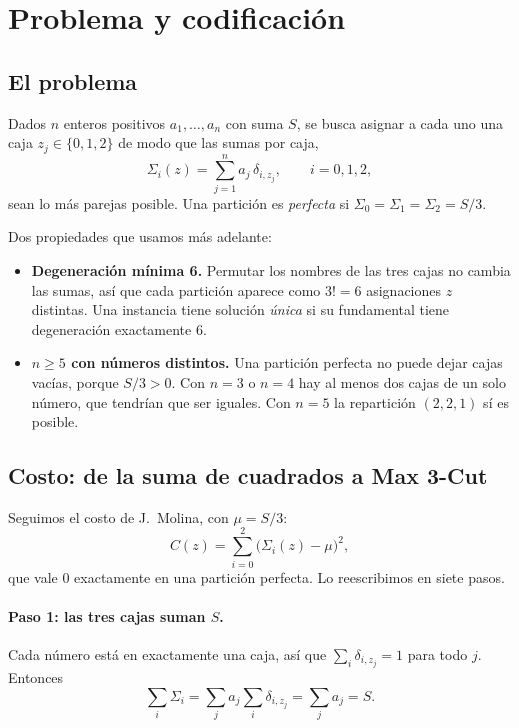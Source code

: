 \documentclass[11pt,a4paper]{article}
\begin{document}
\tableofcontents

\section{Problema y codificación}

\subsection{El problema}

Dados $n$ enteros positivos $a_1,\dots,a_n$ con suma $S$, se busca asignar a cada uno una caja
$z_j\in\{0,1,2\}$ de modo que las sumas por caja,
\begin{equation}
  \Sigma_i(z)=\sum_{j=1}^n a_j\,\delta_{i,z_j},\qquad i=0,1,2,
\end{equation}
sean lo más parejas posible. Una partición es \emph{perfecta} si $\Sigma_0=\Sigma_1=\Sigma_2=S/3$.

Dos propiedades que usamos más adelante:
\begin{itemize}
\item \textbf{Degeneración mínima 6.} Permutar los nombres de las tres cajas no cambia las
  sumas, así que cada partición aparece como $3!=6$ asignaciones $z$ distintas. Una instancia
  tiene solución \emph{única} si su fundamental tiene degeneración exactamente 6.
\item \textbf{$n\geq5$ con números distintos.} Una partición perfecta no puede dejar cajas vacías,
  porque $S/3>0$. Con $n=3$ o $n=4$ hay al menos dos cajas de un solo número, que tendrían que
  ser iguales. Con $n=5$ la repartición $(2,2,1)$ sí es posible.
\end{itemize}

\subsection{Costo: de la suma de cuadrados a Max 3-Cut}

Seguimos el costo de J.~Molina, con $\mu=S/3$:
\begin{equation}
  C(z)=\sum_{i=0}^{2}\big(\Sigma_i(z)-\mu\big)^2 ,
  \label{eq:costo}
\end{equation}
que vale 0 exactamente en una partición perfecta. Lo reescribimos en siete pasos.

\paragraph{Paso 1: las tres cajas suman $S$.} Cada número está en exactamente una caja, así que
$\sum_i\delta_{i,z_j}=1$ para todo $j$. Entonces
\begin{equation}
  \sum_i\Sigma_i=\sum_ja_j\sum_i\delta_{i,z_j}=\sum_ja_j=S .
\end{equation}
\end{document}
